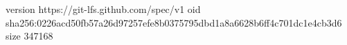 version https://git-lfs.github.com/spec/v1
oid sha256:0226acd50fb57a26d97257efe8b0375795dbd1a8a6628b6ff4c701dc1e4cb3d6
size 347168
